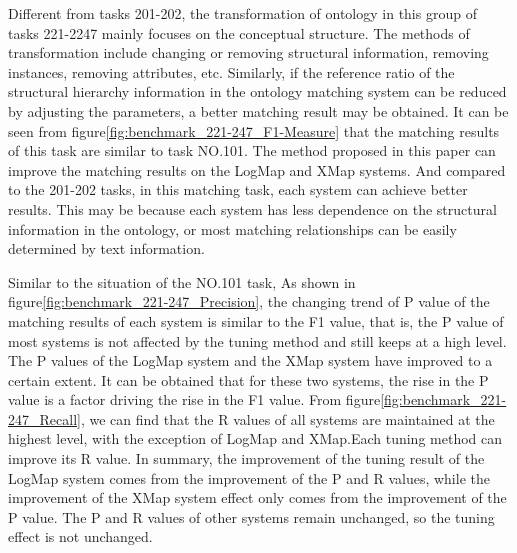 \documentclass[twoside]{article}
\begin{document}
Different from tasks 201-202, the transformation of ontology in this group of tasks 221-2247 mainly focuses on the conceptual structure. The methods of transformation include changing or removing structural information, removing instances, removing attributes, etc.
Similarly, if the reference ratio of the structural hierarchy information in the ontology matching system can be reduced by adjusting the parameters, a better matching result may be obtained.
It can be seen from figure\ref{fig:benchmark_221-247_F1-Measure} that the matching results of this task are similar to task NO.101. The method proposed in this paper can improve the matching results on the LogMap and XMap systems.
And compared to the 201-202 tasks, in this matching task, each system can achieve better results. This may be because each system has less dependence on the structural information in the ontology, or most matching relationships can be easily determined by text information.

Similar to the situation of the NO.101 task, As shown in figure\ref{fig:benchmark_221-247_Precision}, the changing trend of P value of the matching results of each system is similar to the F1 value, that is, the P value of most systems is not affected by the tuning method and still keeps at a high level. The P values of the LogMap system and the XMap system have improved to a certain extent. It can be obtained that for these two systems, the rise in the P value is a factor driving the rise in the F1 value.
From figure\ref{fig:benchmark_221-247_Recall}, we can find that the R values of all systems are maintained at the highest level, with the exception of LogMap and XMap.Each tuning method can improve its R value.
In summary, the improvement of the tuning result of the LogMap system comes from the improvement of the P and R values, while the improvement of the XMap system effect only comes from the improvement of the P value. The P and R values of other systems remain unchanged, so the tuning effect is not unchanged.

\end{document}
